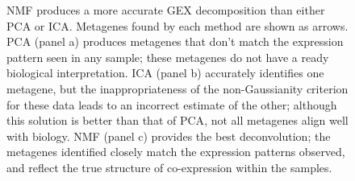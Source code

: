 \documentclass[dissertation.tex]{subfiles}
\begin{document}
\begin{figure}[!htbp]
  \centering
  \caption[Comparison of \texorpdfstring{\acrshort{GEX}}{GEX} deconvolution techniques]{\gls{NMF} produces a more accurate \gls{GEX} decomposition than either \gls{PCA} or \gls{ICA}.  Metagenes found by each method are shown as arrows.  \gls{PCA} (panel a) produces metagenes that don't match the expression pattern seen in any sample; these metagenes do not have a ready biological interpretation.  \gls{ICA} (panel b) accurately identifies one metagene, but the inappropriateness of the non-Gaussianity criterion for these data leads to an incorrect estimate of the other; although this solution is better than that of \gls{PCA}, not all metagenes align well with biology.  \gls{NMF} (panel c) provides the best deconvolution; the metagenes identified closely match the expression patterns observed, and reflect the true structure of co-expression within the samples.}\label{fig:sigs-example-matrixfactor-methods}
\end{figure}
\end{document}
